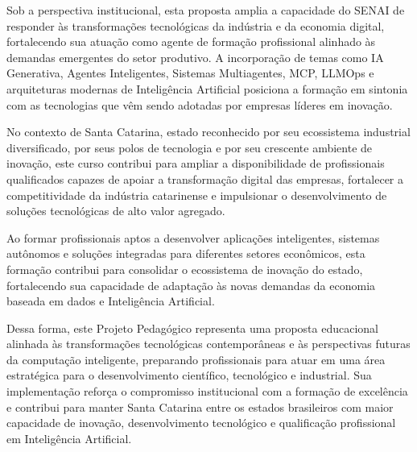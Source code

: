Sob a perspectiva institucional, esta proposta amplia a capacidade do SENAI de responder às transformações tecnológicas da indústria e da economia digital, fortalecendo sua atuação como agente de formação profissional alinhado às demandas emergentes do setor produtivo. A incorporação de temas como IA Generativa, Agentes Inteligentes, Sistemas Multiagentes, MCP, LLMOps e arquiteturas modernas de Inteligência Artificial posiciona a formação em sintonia com as tecnologias que vêm sendo adotadas por empresas líderes em inovação.

No contexto de Santa Catarina, estado reconhecido por seu ecossistema industrial diversificado, por seus polos de tecnologia e por seu crescente ambiente de inovação, este curso contribui para ampliar a disponibilidade de profissionais qualificados capazes de apoiar a transformação digital das empresas, fortalecer a competitividade da indústria catarinense e impulsionar o desenvolvimento de soluções tecnológicas de alto valor agregado.

Ao formar profissionais aptos a desenvolver aplicações inteligentes, sistemas autônomos e soluções integradas para diferentes setores econômicos, esta formação contribui para consolidar o ecossistema de inovação do estado, fortalecendo sua capacidade de adaptação às novas demandas da economia baseada em dados e Inteligência Artificial.

Dessa forma, este Projeto Pedagógico representa uma proposta educacional alinhada às transformações tecnológicas contemporâneas e às perspectivas futuras da computação inteligente, preparando profissionais para atuar em uma área estratégica para o desenvolvimento científico, tecnológico e industrial. Sua implementação reforça o compromisso institucional com a formação de excelência e contribui para manter Santa Catarina entre os estados brasileiros com maior capacidade de inovação, desenvolvimento tecnológico e qualificação profissional em Inteligência Artificial.

